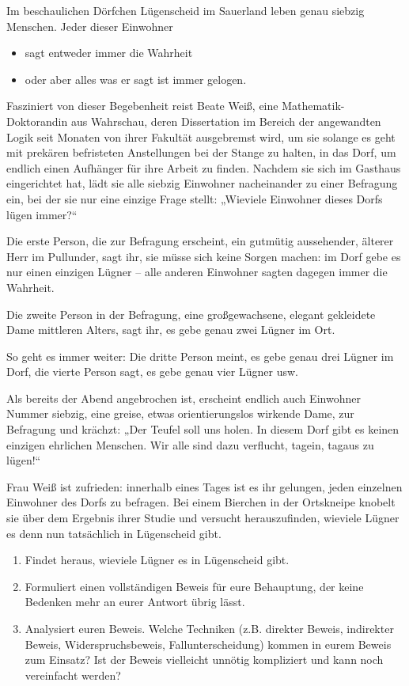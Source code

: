 \begin{aufg}[Das Dorf der Lügner]
    Im beschaulichen Dörfchen Lügenscheid im Sauerland leben genau siebzig Menschen. Jeder dieser Einwohner 
    \begin{itemize}
        \item sagt entweder immer die Wahrheit
        \item oder aber alles was er sagt ist immer gelogen.
    \end{itemize}
    Fasziniert von dieser Begebenheit reist Beate Weiß, eine Mathematik-Doktorandin aus Wahrschau, deren Dissertation im Bereich der angewandten Logik seit Monaten von ihrer Fakultät ausgebremst wird, um sie solange es geht mit prekären befristeten Anstellungen bei der Stange zu halten, in das Dorf, um endlich einen Aufhänger für ihre Arbeit zu finden. Nachdem sie sich im Gasthaus eingerichtet hat, lädt sie alle siebzig Einwohner nacheinander zu einer Befragung ein, bei der sie nur eine einzige Frage stellt: „Wieviele Einwohner dieses Dorfs lügen immer?“
    
    Die erste Person, die zur Befragung erscheint, ein gutmütig aussehender, älterer Herr im Pullunder, sagt ihr, sie müsse sich keine Sorgen machen: im Dorf gebe es nur einen einzigen Lügner -- alle anderen Einwohner sagten dagegen immer die Wahrheit.
    
    Die zweite Person in der Befragung, eine großgewachsene, elegant gekleidete Dame mittleren Alters, sagt ihr, es gebe genau zwei Lügner im Ort.
    
    So geht es immer weiter: Die dritte Person meint, es gebe genau drei Lügner im Dorf, die vierte Person sagt, es gebe genau vier Lügner usw.
    
    Als bereits der Abend angebrochen ist, erscheint endlich auch Einwohner Nummer siebzig, eine greise, etwas orientierungslos wirkende Dame, zur Befragung und krächzt: „Der Teufel soll uns holen. In diesem Dorf gibt es keinen einzigen ehrlichen Menschen. Wir alle sind dazu verflucht, tagein, tagaus zu lügen!“
    
    Frau Weiß ist zufrieden: innerhalb eines Tages ist es ihr gelungen, jeden einzelnen Einwohner des Dorfs zu befragen. Bei einem Bierchen in der Ortskneipe knobelt sie über dem Ergebnis ihrer Studie und versucht herauszufinden, wieviele Lügner es denn nun tatsächlich in Lügenscheid gibt.
    \begin{enumerate}
        \item Findet heraus, wieviele Lügner es in Lügenscheid gibt.
        \item Formuliert einen vollständigen Beweis für eure Behauptung, der keine Bedenken mehr an eurer Antwort übrig lässt.
        \item Analysiert euren Beweis. Welche Techniken (z.B. direkter Beweis, indirekter Beweis, Widerspruchsbeweis, Fallunterscheidung) kommen in eurem Beweis zum Einsatz? Ist der Beweis vielleicht unnötig kompliziert und kann noch vereinfacht werden?
    \end{enumerate}
\end{aufg}

